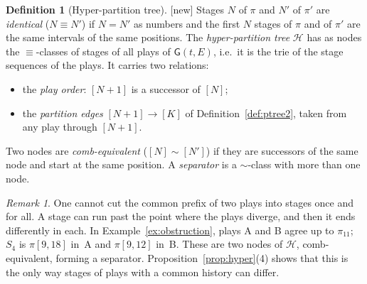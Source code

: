 \documentclass[11pt]{article}
\newcommand{\Gm}{\mathsf{G}}
\newcommand{\iv}[2]{\pi[#1,#2]}
\newcommand{\ra}[1]{\xrightarrow{#1}}
\newcommand{\New}{\textsf{[new]}}
\theoremstyle{plain}
\theoremstyle{definition}
\newtheorem{definition}[theorem]{Definition}
\theoremstyle{remark}
\newtheorem{remark}[theorem]{Remark}
\begin{document}
\begin{definition}[Hyper-partition tree]\label{def:hyper}
\New{} Stages $N$ of $\pi$ and $N'$ of $\pi'$ are \emph{identical}
($N\equiv N'$) if $N=N'$ as numbers and the first $N$ stages of $\pi$
and of $\pi'$ are the same intervals of the same positions.  The
\emph{hyper-partition tree} $\mathcal H$ has as nodes the
$\equiv$-classes of stages of all plays of $\Gm(t,E)$, i.e.\ it is the
trie of the stage sequences of the plays.  It carries two relations:
\begin{itemize}
\item the \emph{play order}: $[N+1]$ is a successor of $[N]$;
\item the \emph{partition edges} $[N+1]\ra{}[K]$ of
  Definition~\ref{def:ptree2}, taken from any play through $[N+1]$.
\end{itemize}
Two nodes are \emph{comb-equivalent} ($[N]\sim[N']$) if they are
successors of the same node and start at the same position.  A
\emph{separator} is a $\sim$-class with more than one node.
\end{definition}

\begin{remark}
One cannot cut the common prefix of two plays into stages once and
for all.  A stage can run past the point where the plays diverge, and
then it ends differently in each.  In Example~\ref{ex:obstruction},
plays A and B agree up to $\pi_{11}$; $S_4$ is $\iv9{18}$ in~A and
$\iv9{12}$ in~B.  These are two nodes of $\mathcal H$, comb-equivalent,
forming a separator.  Proposition~\ref{prop:hyper}(4) shows that this
is the only way stages of plays with a common history can differ.
\end{remark}
\end{document}
